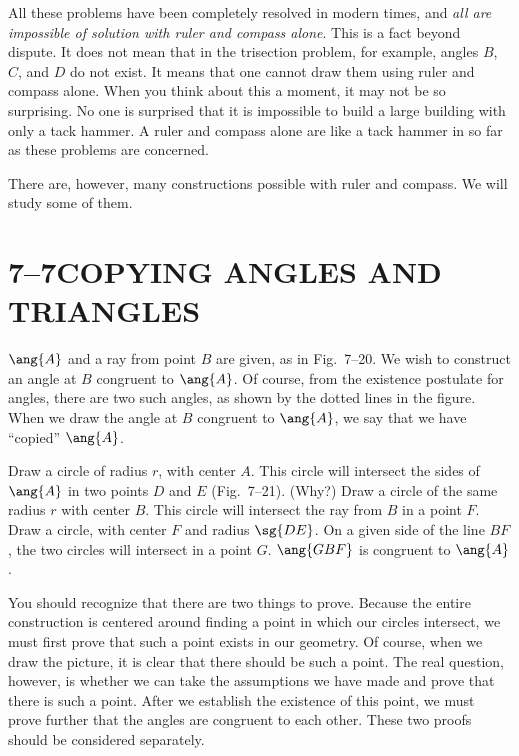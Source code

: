 \documentclass[11pt]{book}
\theoremstyle{bkplain}
\theoremstyle{XIplainnote}
\theoremstyle{bkplain}
\theoremstyle{bkplain}
\begin{document}
\FIGVIIEIGHTEENNINETEEN

All these problems have been completely resolved in modern times, and
\emph{all are impossible of solution with ruler and compass alone}. This is a
fact beyond dispute. It does not mean that in the trisection problem, for
example, angles $B$, $C$, and $D$ do not exist. It means that one cannot draw
them using ruler and compass alone. When you think about this a moment, it may
not be so surprising. No one is surprised that it is impossible to build a
large building with only a tack hammer. A ruler and compass alone are like a
tack hammer in so far as these problems are concerned.

There are, however, many constructions possible with ruler and compass. We will
study some of them.

\section*{7--7\quad COPYING ANGLES AND TRIANGLES}

$\ang{A}$ and a ray from point $B$ are given, as in Fig.~7--20. We wish to
construct an angle at $B$ congruent to $\ang{A}$. Of course, from the existence
postulate for angles, there are two such angles, as shown by the dotted lines
in the figure. When we draw the angle at $B$ congruent to $\ang{A}$, we say
that we have ``copied'' $\ang{A}$.

\FIGVIITWENTYTWENTYONE

\begin{construction}
Draw a circle of radius $r$, with center $A$. This circle will intersect the
sides of $\ang{A}$ in two points $D$ and $E$ (Fig.~7--21). (Why?) Draw a circle
of the same radius $r$ with center $B$. This circle will intersect the ray from
$B$ in a point $F$. Draw a circle, with center $F$ and radius $\sg{DE}$. On a
given side of the line $BF$, the two circles will intersect in a point $G$.
$\ang{GBF}$ is congruent to $\ang{A}$.
\end{construction}

You should recognize that there are two things to prove. Because the entire
construction is centered around finding a point in which our circles intersect,
we must first prove that such a point exists in our geometry. Of course, when
we draw the picture, it is clear that there should be such a point. The real
question, however, is whether we can take the assumptions we have made and
prove that there is such a point. After we establish the existence of this
point, we must prove further that the angles are congruent to each other. These
two proofs should be considered separately.
\end{document}

